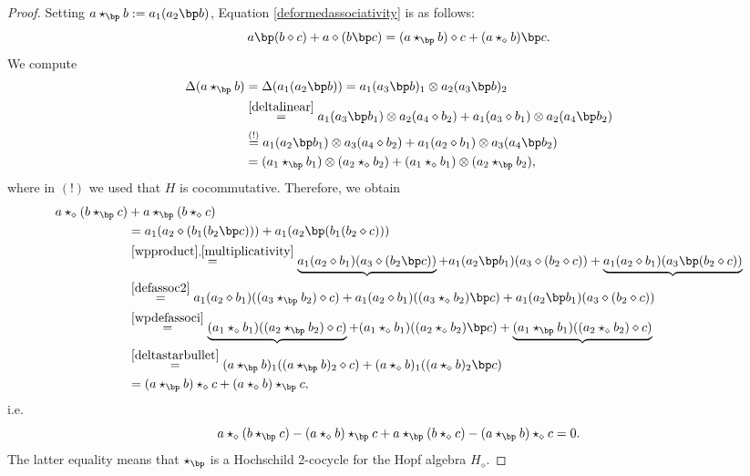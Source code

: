 \documentclass[10pt]{article}
\theoremstyle{definition}
\renewcommand{\wp}{\diamond}
\newcommand{\ot}{\otimes}
\begin{document}
\begin{proof}
Setting $a\star_{\bp}b:=a_{1}(a_{2}\bp b)$, Equation \eqref{deformedassociativity} is as follows:
\begin{equation}\label{defassoc2}
    a\bp(b\wp c)+a\wp(b\bp c)= (a\star_{\bp}b)\wp c+(a\star_{\wp}b)\bp c. 
\end{equation}
We compute
\begin{align}\label{deltastarbullet}
\Delta(a\star_{\bp}b)&=\Delta(a_{1}(a_{2}\bp b))=a_{1}(a_{3}\bp b)_{1}\ot a_{2}(a_{3}\bp b)_{2}\\&\overset{\eqref{deltalinear}}{=}\nonumber a_{1}(a_{3}\bp b_{1})\ot a_{2}(a_{4}\wp b_{2})+a_{1}(a_{3}\wp b_{1})\ot a_{2}(a_{4}\bp b_{2})\\&\nonumber\overset{(!)}{=}a_{1}(a_{2}\bp b_{1})\ot a_{3}(a_{4}\wp b_{2})+a_{1}(a_{2}\wp b_{1})\ot a_{3}(a_{4}\bp b_{2})\\&\nonumber=(a_{1}\star_{\bp} b_{1})\ot (a_{2}\star_{\wp} b_{2})+(a_{1}\star_{\wp} b_{1})\ot(a_{2}\star_{\bp} b_{2}),
\end{align}
where in $(!)$ we used that $H$ is cocommutative. Therefore, we obtain
\[
\begin{split}
  a\star_{\wp}(b\star_{\bp}c)&+a\star_{\bp}(b\star_{\wp}c)\\&%
  = a_{1}(a_{2}\wp(b_{1}(b_{2}\bp c)))+a_{1}(a_{2}\bp(b_{1}(b_{2}\wp c)))\\&\overset{\eqref{wpproduct},\eqref{multiplicativity}}{=}\underbrace{a_{1}(a_{2}\wp b_{1})(a_{3}\wp(b_{2}\bp c))}+a_{1}(a_{2}\bp b_{1})(a_{3}\wp(b_{2}\wp c))+\underbrace{a_{1}(a_{2}\wp b_{1})(a_{3}\bp(b_{2}\wp c))}\\&\overset{\eqref{defassoc2}}{=}a_{1}(a_{2}\wp b_{1})((a_{3}\star_{\bp} b_{2})\wp c)+a_{1}(a_{2}\wp b_{1})((a_{3}\star_{\wp} b_{2})\bp c)+a_{1}(a_{2}\bp b_{1})(a_{3}\wp(b_{2}\wp c))\\&\overset{\eqref{wpdefassoci}}{=}\underbrace{(a_{1}\star_{\wp} b_{1})((a_{2}\star_{\bp} b_{2})\wp c)}+(a_{1}\star_{\wp} b_{1})((a_{2}\star_{\wp} b_{2})\bp c)+\underbrace{(a_{1}\star_{\bp}b_{1})((a_{2}\star_{\wp} b_{2})\wp c)}\\&\overset{\eqref{deltastarbullet}}{=}(a\star_{\bp} b)_{1}((a\star_{\bp} b)_{2}\wp c)+(a\star_{\wp} b)_{1}((a\star_{\wp} b)_{2}\bp c)\\&=(a\star_{\bp}b)\star_{\wp}c+(a\star_{\wp}b)\star_{\bp}c,
\end{split}
\]
i.e.
\[
a\star_{\wp}(b\star_{\bp}c)-(a\star_{\wp}b)\star_{\bp}c+a\star_{\bp}(b\star_{\wp}c)-(a\star_{\bp}b)\star_{\wp}c=0.
\]
The latter equality means that $\star_{\bp}$ is a Hochschild 2-cocycle for the Hopf algebra $H_{\wp}$.
\end{proof}
\end{document}
